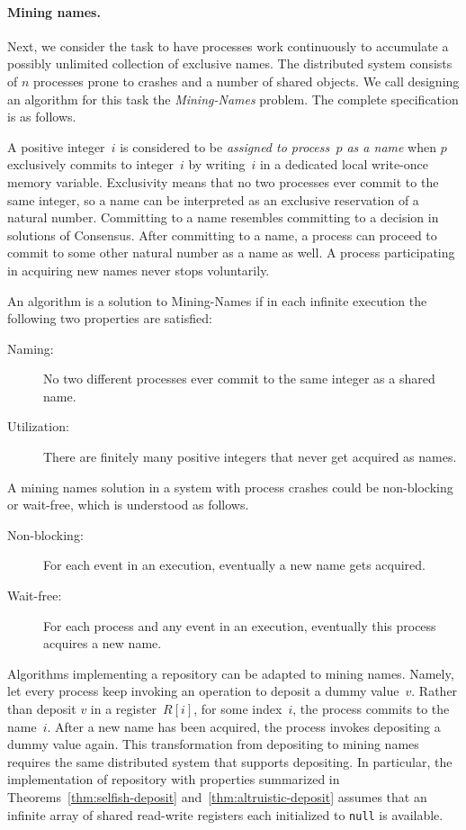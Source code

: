 \documentclass[11pt]{article}
\newcommand{\BBB}{\vspace*{-\bigskipamount}}
\newcommand{\Paragraph}[1]{\BBB\paragraph{#1}}
\begin{document}
\Paragraph{Mining names.}



Next, we consider the task to have processes work continuously to accumulate a possibly  unlimited collection of exclusive names.
The distributed system consists of $n$ processes prone to crashes and a number of shared objects.
We call designing an algorithm for this task the \emph{Mining-Names} problem.
The complete specification is as follows.

A positive integer~$i$ is considered to be \emph{assigned to process~$p$ as a name} when $p$ exclusively commits to integer~$i$ by writing~$i$  in a dedicated local write-once memory variable.
Exclusivity means that no two processes ever commit to the same integer, so a name can be interpreted as an exclusive reservation of a natural number.
Committing to a name resembles committing to a decision in solutions of Consensus.
After committing to a name, a process can proceed to commit to some other natural number as a name as well.
A process participating in acquiring new names never stops voluntarily.

An algorithm is a solution to Mining-Names if in each infinite execution the following two properties are satisfied:
\begin{description}
\item[\sf Naming:] 
No two different processes ever commit to the same integer as a shared name.

\item[\sf Utilization:] 
There are finitely many positive integers that never get acquired as names.
\end{description}
A mining names solution in a system with process crashes could be non-blocking or wait-free, which is understood as follows.
\begin{description}
\item[\sf Non-blocking:] 
For each  event in an execution, eventually a new name gets acquired.
\item[\sf Wait-free:] 
For each  process and any event in an execution, eventually this process acquires a new name.
\end{description}

Algorithms implementing a repository can be adapted to mining names. 
Namely, let every process keep invoking an operation to deposit a dummy value~$v$.
Rather than deposit $v$ in a register~$R[i]$, for some index~$i$, the process commits to the name~$i$.
After a new name has been acquired, the process invokes depositing a dummy value again.
This transformation from depositing to mining names requires the same distributed system that supports depositing.
In particular, the implementation of repository with properties summarized in Theorems~\ref{thm:selfish-deposit} and~\ref{thm:altruistic-deposit} assumes that an infinite array of shared read-write registers each initialized to \texttt{null} is available.
\end{document}
